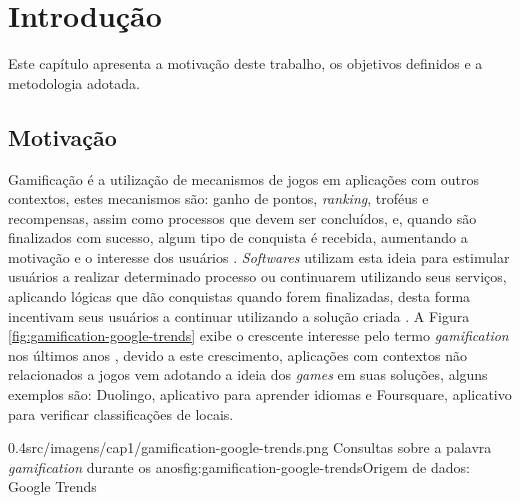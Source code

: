 \chapter[Introdução]{Introdução}
\label{ch:introducao}
\par Este capítulo apresenta a motivação deste trabalho, os objetivos definidos e a metodologia adotada.

\section{Motivação}

\par Gamificação é a utilização de mecanismos de jogos em aplicações com outros contextos, estes mecanismos são: ganho de pontos, \textit{ranking}, troféus e recompensas, assim como processos que devem ser concluídos, e, quando são finalizados com sucesso, algum tipo de conquista é recebida, aumentando a motivação e o interesse dos usuários \cite{robson2015all}. \textit{Softwares} utilizam esta ideia para estimular usuários a realizar determinado processo ou continuarem utilizando seus serviços, aplicando lógicas que dão conquistas quando forem finalizadas, desta forma incentivam seus usuários a continuar utilizando a solução criada \cite{hamari2014does}. A Figura \ref{fig:gamification-google-trends} exibe o crescente interesse pelo termo \textit{gamification} nos últimos anos \cite{groh2012gamification}, devido a este crescimento, aplicações com contextos não relacionados a jogos vem adotando a ideia dos \textit{games} em suas soluções, alguns exemplos são: Duolingo, aplicativo para aprender idiomas e Foursquare, aplicativo para verificar classificações de locais.

\begin{image}
{0.4}{src/imagens/cap1/gamification-google-trends.png}
{Consultas sobre a palavra \textit{gamification} durante os anos}{fig:gamification-google-trends}{Origem de dados: Google Trends }
\end{image}


